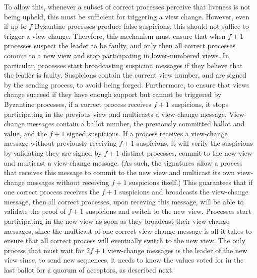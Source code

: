 To allow this, whenever a subset of correct processes perceive that liveness is not being upheld, this must be sufficient for triggering a view change. However, even if up to $f$ Byzantine processes produce false suspicions, this should not suffice to trigger a view change. Therefore, this mechanism must ensure that when $f+1$ processes suspect the leader to be faulty, and only then all correct processes commit to a new view and stop participating in lower-numbered views. In particular, processes start broadcasting suspicion messages if they believe that the leader is faulty. Suspicions contain the current view number, and are signed by the sending process, to avoid being forged. Furthermore, to ensure that views change succeed if they have enough support but cannot be triggered by Byzantine processes, if a correct process receives $f+1$ suspicions, it stops participating in the previous view and multicasts a view-change message. View-change messages contain a ballot number, the previously committed ballot and value, and the $f+1$ signed suspicions. If a process receives a view-change message without previously receiving $f+1$ suspicions, it will verify the suspicions by validating they are signed by $f+1$ distinct processes, commit to the new view and multicast a view-change message. (As such, the signatures allow a process that receives this message to commit to the new view and multicast its own view-change messages without receiving $f+1$ suspicions itself.)  This guarantees that if one correct process receives the $f+1$ suspicions and broadcasts the view-change message, then all correct processes, upon receving this message, will be able to validate the proof of $f+1$ suspicions and switch to the new view. Processes start participating in the new view as soon as they broadcast their view-change messages, since the multicast of one correct view-change message is all it takes to ensure that all correct process will eventually switch to the new view. The only process that must wait for $2f+1$ view-change messages is the leader of the new view since, to send new sequences, it needs to know the values voted for in the last ballot for a quorum of acceptors, as described next.




